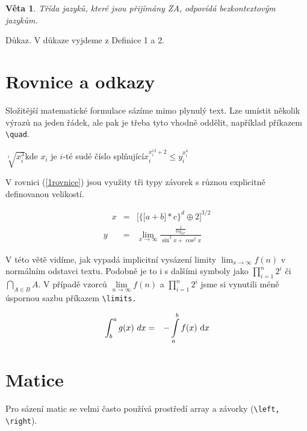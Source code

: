 \documentclass[a4paper, twocolumn, 11pt]{article}
\newtheorem{veta}{Věta}
\begin{document}
    \begin{veta}
    Třída jazyků, které jsou přijímány ZA, odpovídá
    \textnormal{bezkontextovým jazykům.}
    \end{veta}
    
    \noindent
    Důkaz. V důkaze vyjdeme z Definice 1 a 2.

\section{Rovnice a odkazy}

    Složitější matematické formulace sázíme mimo plynulý
    text. Lze umístit několik výrazů na jeden řádek, ale pak je
    třeba tyto vhodně oddělit, například příkazem \verb=\quad=.
    
    \quad
    
    $\sqrt[i]{x_i^3} $\quad kde $x_i $ je $i $-té sudé číslo splňující\quad $x_i^{x_i^{i}^2+2} \leq 
    y_i^{x_i^4} $
    
    \quad
    
    V rovnici (\ref{1rovnice}) jsou využity tři typy závorek s různou explicitně definovanou velikostí.
    
    \begin{eqnarray}
        \label{1rovnice}
            \quad
            x&=& \bigg[\Big\{\big[a+b\big]*c\Big\}^d\oplus2\bigg]^{3/2} 
            \\
            y&=& \lim\limits_{x \to \infty} \frac{\frac{1}{log_{10^x}}}{\sin^2x+\cos^2x} 
            \nonumber
    \end{eqnarray}
    
    \par
    
    V této větě vidíme, jak vypadá implicitní vysázení limity $\lim_{x \to \infty}f(n) $ v
    normálním odstavci textu. Podobně je to i s dalšími symboly jako $\prod_{i=1}^n 2^i $ či $\bigcap_{A\in B}A $. V případě vzorců $\lim\limits_{n \to \infty}f(n) $ a $\prod\limits_{i=1}^{n} 2^i $ jsme si vynutili méně úspornou sazbu příkazem \verb=\limits.=
    
    \begin{eqnarray}
        \label{2rovnice}
            \int_{b}^{a}g(x)\ dx&=&- \int\limits_{a}^{b}f(x)\ \textnormal{d}x
    \end{eqnarray}
    
\section{Matice}
    Pro sázení matic se velmi často používá prostředí array a závorky (\verb=\left, \right=).
    
\end{document}
